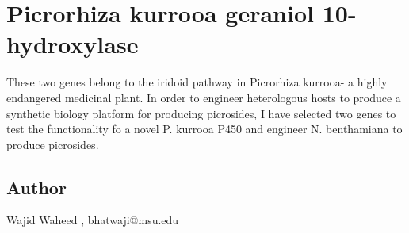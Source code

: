 \documentclass{article}%
\begin{document}
%
\section{Picrorhiza kurrooa geraniol 10{-}hydroxylase}%
These two genes belong to the iridoid pathway in Picrorhiza kurrooa{-} a highly endangered medicinal plant. In order to engineer heterologous hosts to produce a synthetic biology platform for producing picrosides, I have selected two genes to test the functionality fo a novel P. kurrooa P450 and engineer N. benthamiana to produce picrosides.%
\subsection{Author}%
Wajid Waheed%
,%
bhatwaji@msu.edu

%
\end{document}
